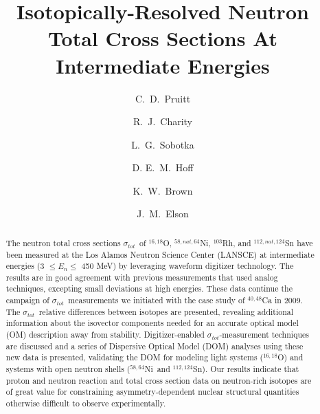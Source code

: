 \documentclass[twocolumn,secnumarabic,amssymb, nobibnotes, aps, prl,
superscriptaddress, nobalancelastpage]{revtex4}
\newcommand{\tot}{\ensuremath{\sigma_{tot}}}
\newcommand{\oSixEight}{\ensuremath{^{16,18}}O}
\newcommand{\niEightFour}{\ensuremath{^{58,64}}N\lowercase{i}}
\newcommand{\snTwelveFour}{\ensuremath{^{112,124}}S\lowercase{n}}
\begin{document}
\begin{abstract}
    The neutron total cross sections \tot\ of $^{16,18}$O,
    $^{58,nat,64}$Ni, $^{103}$Rh, and $^{112,nat,124}$Sn have been measured at the Los Alamos
    Neutron Science Center (LANSCE) at intermediate energies (3 $\leq E_{n}
    \leq$ 450 MeV) by
    leveraging waveform digitizer technology. The results are in good agreement
    with previous measurements that used analog techniques,
    excepting small deviations at high energies. These data
    continue the campaign of
    \tot\ measurements we initiated with the case study of $^{40,48}$Ca in 2009.
    The \tot\ relative differences between isotopes are presented,
    revealing additional information about
    the isovector components needed for an accurate optical model (OM)
    description away from stability. Digitizer-enabled \tot-measurement
    techniques are discussed and a series of Dispersive Optical Model (DOM)
    analyses using these new data is presented, validating the DOM for modeling light
    systems (\oSixEight) and systems with open neutron shells (\niEightFour\ and \snTwelveFour).
    Our results indicate that proton and neutron reaction and total cross
    section data on neutron-rich isotopes are of great value for constraining
    asymmetry-dependent nuclear structural quantities otherwise difficult
    to observe experimentally.
\end{abstract}

\title{Isotopically-Resolved Neutron Total Cross Sections At
Intermediate Energies}

\author{C.~D.~Pruitt}  
\author{R.~J.~Charity}
\author{L.~G.~Sobotka}
\author{D. E.~M.~Hoff}  

\author{K.~W.~Brown} 
\author{J.~M.~Elson}
\end{document}
